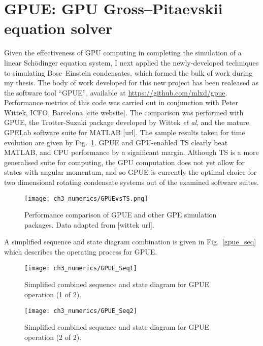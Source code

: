 \section{GPUE: GPU Gross--Pitaevskii equation solver}

Given the effectiveness of GPU computing in completing the simulation of a linear Sch\"odinger equation system, I next applied the newly-developed techniques to simulating Bose--Einstein condensates, which formed the bulk of work during my thesis. The body of work developed for this new project has been realeased as the software tool ``GPUE'', available at \url{https://github.com/mlxd/gpue}. Performance metrics of this code was carried out in conjunction with Peter Wittek, ICFO, Barcelona [cite website]. The comparison was performed with GPUE, the Trotter-Suzuki package developed by Wittek \textit{et al}, and the mature GPELab software suite for MATLAB [url]. The sample results taken for time evolution are given by Fig.~\ref{fig:gpuevsts}. GPUE and GPU-enabled TS clearly beat MATLAB, and CPU performance by a significant margin. Although TS is a more generalised suite for computing, the GPU computation does not yet allow for states with angular momentum, and so GPUE is currently the optimal choice for two dimensional rotating condensate systems out of the examined software suites.

\begin{figure}[htb]
    \centering
    \texttt{[image: ch3\_numerics/GPUEvsTS.png]}
    \caption{Performance comparison of GPUE and other GPE simulation packages. Data adapted from [wittek url].}
    \label{fig:gpuevsts}
\end{figure}

A simplified sequence and state diagram combination is given in Fig.~\ref{gpue_seq} which describes the operating process for GPUE.

\begin{figure}[h]
    \centering
        \texttt{[image: ch3\_numerics/GPUE\_Seq1]}
    \caption{Simplified combined sequence and state diagram for GPUE operation (1 of 2).}
    \label{fig:gpue_seq}
\end{figure}
\begin{figure}[h]
    \centering
        \texttt{[image: ch3\_numerics/GPUE\_Seq2]}
    \caption{Simplified combined sequence and state diagram for GPUE operation (2 of 2).}
    \label{fig:gpue_seq}
\end{figure}

